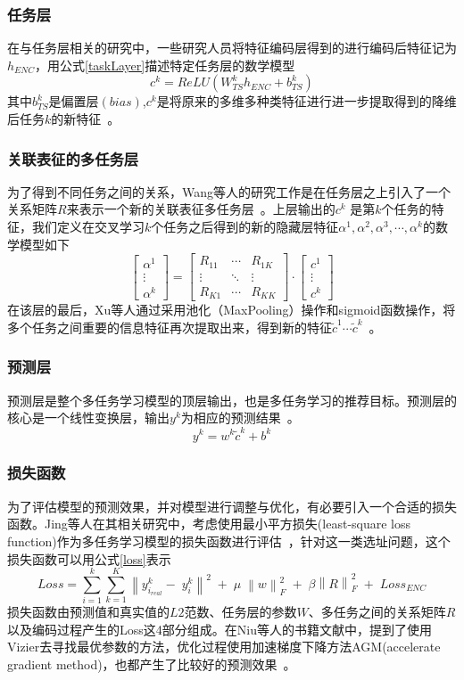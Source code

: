 \documentclass{llncs}
\begin{document}
\subsubsection{任务层}
在与任务层相关的研究中，一些研究人员将特征编码层得到的进行编码后特征记为$h_{ENC}$，用公式\ref{taskLayer}描述特定任务层的数学模型
\begin{equation}
	\label{taskLayer}
	c^k=ReLU(W_{TS}^kh_{ENC}+b_{TS}^k)
\end{equation}
其中$b_{TS}^k$是偏置层$(bias)$,$c^k$是将原来的多维多种类特征进行进一步提取得到的降维后任务$k$的新特征~\cite{Held2017Analyzing}。
\subsubsection{关联表征的多任务层}
为了得到不同任务之间的关系，Wang等人的研究工作是在任务层之上引入了一个关系矩阵$R$来表示一个新的关联表征多任务层~\cite{wang2016place}。上层输出的$c^k$ 是第$k$个任务的特征，我们定义在交叉学习$k$个任务之后得到的新的隐藏层特征$\alpha^1,\alpha^2,\alpha^3,\cdots,\alpha^k$的数学模型如下
$$\begin{bmatrix}\alpha^1\\\vdots\\\alpha^k\end{bmatrix}=\begin{bmatrix}R_{11}&\cdots&R_{1K}\\\vdots&\ddots&\vdots\\R_{K1}&\cdots&R_{KK}\end{bmatrix}\cdot\begin{bmatrix}c^1\\\vdots\\c^k\end{bmatrix}$$
在该层的最后，Xu等人通过采用池化（MaxPooling）操作和sigmoid函数操作，将多个任务之间重要的信息特征再次提取出来，得到新的特征$\widetilde c^1\cdots\widetilde c^k$~\cite{xu2016demand}。
\subsubsection{预测层}
预测层是整个多任务学习模型的顶层输出，也是多任务学习的推荐目标。预测层的核心是一个线性变换层，输出$y^k$为相应的预测结果~\cite{Long2017Learning}。
$$y^k=w^k\widetilde c^k+b^k$$
\subsubsection{损失函数}
为了评估模型的预测效果，并对模型进行调整与优化，有必要引入一个合适的损失函数。Jing等人在其相关研究中，考虑使用最小平方损失(least-square loss function)作为多任务学习模型的损失函数进行评估~\cite{Jing2016Where}，针对这一类选址问题，这个损失函数可以用公式\ref{loss}表示
\begin{equation}
	\label{loss}
	Loss=\sum_{i=1}^k\sum_{k=1}^K\left\|y_{i_{real}}^k-\;y_i^k\right\|^2\;+\;\mu\;\left\|w\right\|_F^2\;+\;\beta\left\|R\right\|_F^2\;+\;Loss_{ENC}
\end{equation}
损失函数由预测值和真实值的$L2$范数、任务层的参数$W$、多任务之间的关系矩阵$R$以及编码过程产生的Loss这4部分组成。在Niu等人的书籍文献中，提到了使用Vizier去寻找最优参数的方法，优化过程使用加速梯度下降方法AGM(accelerate gradient method)，也都产生了比较好的预测效果~\cite{Niu2016Exploiting}。
\end{document}
